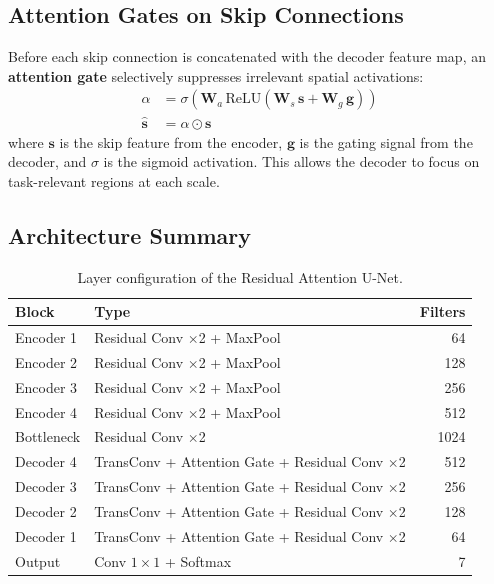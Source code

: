 \documentclass[12pt,a4paper]{article}
\begin{document}
\subsection{Attention Gates on Skip Connections}

Before each skip connection is concatenated with the decoder feature map, an
\textbf{attention gate} selectively suppresses irrelevant spatial activations:
\begin{align}
  \alpha &= \sigma\!\left(\mathbf{W}_a\,\text{ReLU}\!\left(\mathbf{W}_s\,\mathbf{s} + \mathbf{W}_g\,\mathbf{g}\right)\right) \\
  \hat{\mathbf{s}} &= \alpha \odot \mathbf{s}
\end{align}
where $\mathbf{s}$ is the skip feature from the encoder, $\mathbf{g}$ is the
gating signal from the decoder, and $\sigma$ is the sigmoid activation.
This allows the decoder to focus on task-relevant regions at each scale.

\subsection{Architecture Summary}

\begin{table}[H]
\centering
\caption{Layer configuration of the Residual Attention U-Net.}
\begin{tabular}{llr}
\toprule
\textbf{Block} & \textbf{Type} & \textbf{Filters} \\
\midrule
Encoder 1  & Residual Conv $\times$2 + MaxPool & 64 \\
Encoder 2  & Residual Conv $\times$2 + MaxPool & 128 \\
Encoder 3  & Residual Conv $\times$2 + MaxPool & 256 \\
Encoder 4  & Residual Conv $\times$2 + MaxPool & 512 \\
Bottleneck & Residual Conv $\times$2            & 1024 \\
Decoder 4  & TransConv + Attention Gate + Residual Conv $\times$2 & 512 \\
Decoder 3  & TransConv + Attention Gate + Residual Conv $\times$2 & 256 \\
Decoder 2  & TransConv + Attention Gate + Residual Conv $\times$2 & 128 \\
Decoder 1  & TransConv + Attention Gate + Residual Conv $\times$2 & 64 \\
Output     & Conv $1\times1$ + Softmax & 7 \\
\bottomrule
\end{tabular}
\end{table}
\end{document}
